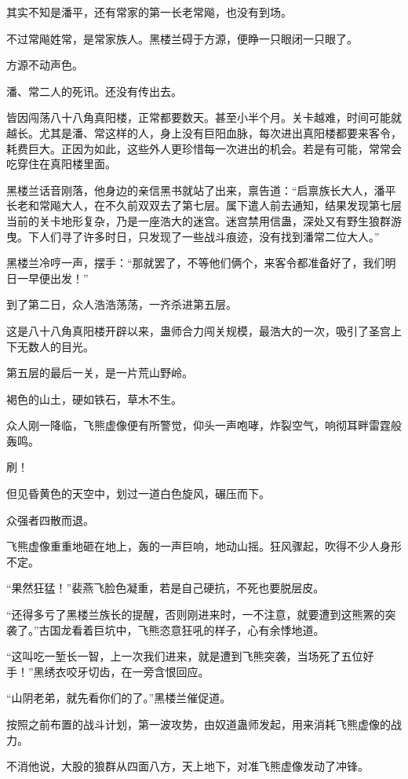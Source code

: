 \begin{this_body}
其实不知是潘平，还有常家的第一长老常飚，也没有到场。

不过常飚姓常，是常家族人。黑楼兰碍于方源，便睁一只眼闭一只眼了。

方源不动声色。

潘、常二人的死讯。还没有传出去。

皆因闯荡八十八角真阳楼，正常都要数天。甚至小半个月。关卡越难，时间可能就越长。尤其是潘、常这样的人，身上没有巨阳血脉，每次进出真阳楼都要来客令，耗费巨大。正因为如此，这些外人更珍惜每一次进出的机会。若是有可能，常常会吃穿住在真阳楼里面。

黑楼兰话音刚落，他身边的亲信黑书就站了出来，禀告道：“启禀族长大人，潘平长老和常飚大人，在不久前双双去了第七层。属下遣人前去通知，结果发现第七层当前的关卡地形复杂，乃是一座浩大的迷宫。迷宫禁用信蛊，深处又有野生狼群游曳。下人们寻了许多时日，只发现了一些战斗痕迹，没有找到潘常二位大人。”

黑楼兰冷哼一声，摆手：“那就罢了，不等他们俩个，来客令都准备好了，我们明日一早便出发！”

到了第二日，众人浩浩荡荡，一齐杀进第五层。

这是八十八角真阳楼开辟以来，蛊师合力闯关规模，最浩大的一次，吸引了圣宫上下无数人的目光。

第五层的最后一关，是一片荒山野岭。

褐色的山土，硬如铁石，草木不生。

众人刚一降临，飞熊虚像便有所警觉，仰头一声咆哮，炸裂空气，响彻耳畔雷霆般轰鸣。

刷！

但见昏黄色的天空中，划过一道白色旋风，碾压而下。

众强者四散而退。

飞熊虚像重重地砸在地上，轰的一声巨响，地动山摇。狂风骤起，吹得不少人身形不定。

“果然狂猛！”裴燕飞脸色凝重，若是自己硬抗，不死也要脱层皮。

“还得多亏了黑楼兰族长的提醒，否则刚进来时，一不注意，就要遭到这熊罴的突袭了。”古国龙看着巨坑中，飞熊恣意狂吼的样子，心有余悸地道。

“这叫吃一堑长一智，上一次我们进来，就是遭到飞熊突袭，当场死了五位好手！”黑绣衣咬牙切齿，在一旁含恨回应。

“山阴老弟，就先看你们的了。”黑楼兰催促道。

按照之前布置的战斗计划，第一波攻势，由奴道蛊师发起，用来消耗飞熊虚像的战力。

不消他说，大股的狼群从四面八方，天上地下，对准飞熊虚像发动了冲锋。


\end{this_body}
